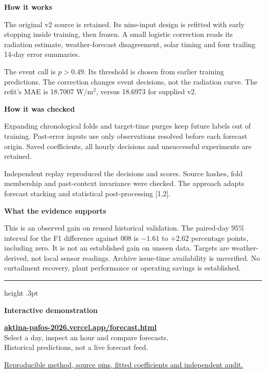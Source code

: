 \documentclass[10pt,a4paper]{article}
\newcommand{\labelhead}[1]{{\small\bfseries #1}\par\vspace{2pt}}
\begin{document}
\vspace{2mm}
\begin{minipage}[t]{.475\linewidth}\raggedright
\labelhead{How it works}
The original v2 source is retained. Its nine-input design is refitted with early stopping inside training, then frozen. A small logistic correction reads its radiation estimate, weather-forecast disagreement, solar timing and four trailing 14-day error summaries.

The event call is $p>0.49$. Its threshold is chosen from earlier training predictions. The correction changes event decisions, not the radiation curve. The refit's MAE is 18.7007 W/m$^2$, versus 18.6973 for supplied v2.
\end{minipage}\hfill
\begin{minipage}[t]{.475\linewidth}\raggedright
\labelhead{How it was checked}
Expanding chronological folds and target-time purges keep future labels out of training. Past-error inputs use only observations resolved before each forecast origin. Saved coefficients, all hourly decisions and unsuccessful experiments are retained.

Independent replay reproduced the decisions and scores. Source hashes, fold membership and past-context invariance were checked. The approach adapts forecast stacking and statistical post-processing [1,2].
\end{minipage}

\vspace{3mm}
\labelhead{What the evidence supports}
This is an observed gain on reused historical validation. The paired-day 95\% interval for the F1 difference against 008 is $-1.61$ to $+2.62$ percentage points, including zero. It is not an established gain on unseen data. Targets are weather-derived, not local sensor readings. Archive issue-time availability is unverified. No curtailment recovery, plant performance or operating savings is established.

\vspace{3mm}
\hrule height .3pt
\vspace{3mm}
\begin{minipage}[c]{.77\linewidth}
\labelhead{Interactive demonstration}
\href{https://aktina-pafos-2026.vercel.app/forecast.html}{\textbf{aktina-pafos-2026.vercel.app/forecast.html}}\\
{\small Select a day, inspect an hour and compare forecasts.\\Historical predictions, not a live forecast feed.}

{\footnotesize\color{muted}\href{https://github.com/stefanosbordea/aktina/tree/stefanos-model/app/experiments/v2-019}{Reproducible method, source pins, fitted coefficients and independent audit.}}
\end{minipage}\hfill
\begin{minipage}[c]{.18\linewidth}\centering
{}
\end{minipage}
\end{document}
